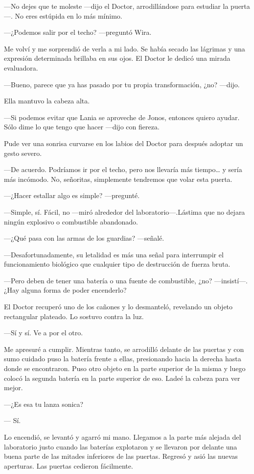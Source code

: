 ---No dejes que te moleste ---dijo el Doctor, arrodillándose para
estudiar la puerta---. No eres estúpida en lo más mínimo.

---¿Podemos salir por el techo? ---preguntó Wira.

Me volví y me sorprendió de verla a mi lado. Se había secado las
lágrimas y una expresión determinada brillaba en sus ojos. El Doctor le
dedicó una mirada evaluadora.

---Bueno, parece que ya has pasado por tu propia transformación, ¿no?
---dijo.

Ella mantuvo la cabeza alta.

---Si podemos evitar que Lania se aproveche de Jonos, entonces quiero
ayudar. Sólo dime lo que tengo que hacer ---dijo con fiereza.

Pude ver una sonrisa curvarse en los labios del Doctor para después
adoptar un gesto severo.

---De acuerdo. Podríamos ir por el techo, pero nos llevaría más
tiempo\ldots{} y sería más incómodo. No, señoritas, simplemente
tendremos que volar esta puerta.

---¿Hacer estallar algo es simple? ---pregunté.

---Simple, sí. Fácil, no ---miró alrededor del laboratorio---.Lástima
que no dejara ningún explosivo o combustible abandonado.

---¿Qué pasa con las armas de los guardias? ---señalé.

---Desafortunadamente, su letalidad es más una señal para interrumpir el
funcionamiento biológico que cualquier tipo de destrucción de fuerza
bruta.

---Pero deben de tener una batería o una fuente de combustible, ¿no?
---insistí---. ¿Hay alguna forma de poder encenderlo?

El Doctor recuperó uno de los cañones y lo desmanteló, revelando un
objeto rectangular plateado. Lo sostuvo contra la luz.

---Sí y sí. Ve a por el otro.

Me apresuré a cumplir. Mientras tanto, se arrodilló delante de las
puertas y con sumo cuidado puso la batería frente a ellas, presionando
hacia la derecha hasta donde se encontraron. Puso otro objeto en la
parte superior de la misma y luego colocó la segunda batería en la parte
superior de eso. Ladeé la cabeza para ver mejor.

---¿Es esa tu lanza sonica?

--- Sí.

Lo encendió, se levantó y agarró mi mano. Llegamos a la parte más
alejada del laboratorio justo cuando las baterías explotaron y se
llevaron por delante una buena parte de las mitades inferiores de las
puertas. Regresó y asió las nuevas aperturas. Las puertas cedieron
fácilmente.

